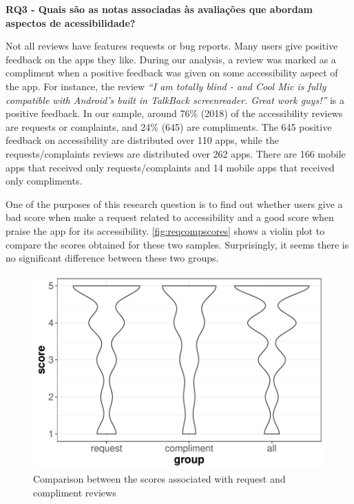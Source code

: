 \textbf{RQ3 - Quais são as notas associadas às avaliações que abordam aspectos de acessibilidade?}


Not all reviews have features requests or bug reports. Many users give positive feedback on the apps they like. 
During our analysis, a review was marked as a compliment when a positive feedback was given on some accessibility aspect of the app. 
For instance, the review \textit{``I am totally blind - and Cool Mic is fully compatible with Android's built in TalkBack screenreader. Great work guys!''} is a positive feedback.
In our sample, around 76\% (2018) of the accessibility reviews are requests or complaints, and 24\% (645) are compliments. 
The 645 positive feedback on accessibility are distributed over 110 apps, while the requests/complaints reviews are distributed over 262 apps. There are 166 mobile apps that received only requests/complaints and 14 mobile apps that received only compliments.

One of the purposes of this research question is to find out whether users give a bad score when make a request related to accessibility and a good score when praise the app for its accessibility. 
\autoref{fig:reqcompscores} shows a violin plot to compare the scores obtained for these two samples. Surprisingly, it seems there is no significant difference between these two groups. 

 \begin{figure}[!htb]
 \centering
\includegraphics[scale=0.8]{imagens/scores-compliment-request.pdf}
\caption{Comparison between the scores associated with request and compliment reviews}
\label{fig:reqcompscores}
\end{figure}

